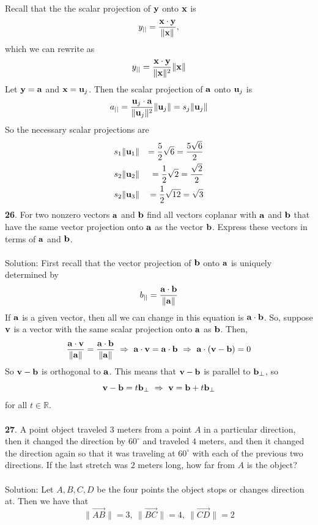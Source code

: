 \documentclass[12pt]{amsbook}
\begin{document}
Recall that the the scalar projection of $\bf y$ onto $\bf x$ is 
$$y_{||}=\frac{{\bf x}\cdot{\bf y}}{\|\bf x\|},$$
which we can rewrite as 
$$y_{||}=\frac{{\bf x}\cdot{\bf y}}{\|{\bf x}\|^2}\|\bf x\|$$
Let ${\bf y}=\bf a$ and ${\bf x}={\bf u}_j$. Then the scalar projection of $\bf a$ onto ${\bf u}_j$ is 
$$a_{||}=\frac{{\bf u}_j\cdot{\bf a}}{\|{\bf u}_j\|^2}\|{\bf u}_j\|=s_j\|{\bf u}_j\|$$
So the necessary scalar projections are
\begin{eqnarray*}
s_1\|{\bf u}_1\|&&=\frac 52 \sqrt{6}= \frac{5\sqrt{6}}{2}\\
s_2\|{\bf u}_2\|&&=\frac 12 \sqrt{2}= \frac{\sqrt{2}}{2}\\
s_2\|{\bf u}_3\|&&=\frac 12 \sqrt{12}=\sqrt{3} \\
\end{eqnarray*}
{\small\bf 26}. For two nonzero vectors ${\bf a}$ and ${\bf b}$
find all vectors coplanar with ${\bf a}$ and ${\bf b}$
that have the same vector projection onto ${\bf a}$ as 
the vector ${\bf b}$. Express these vectors in terms of 
${\bf a}$ and ${\bf b}$.\\
\\
{\sc Solution}:
First recall that the vector projection of $\bf b$ onto $\bf a$ is uniquely determined by 
$$b_{||}=\frac{{\bf a}\cdot{\bf b}}{\|\bf a\|}$$
If $\bf a$ is a given vector, then all we can change in this equation is ${\bf a}\cdot{\bf b}$. So, suppose $\bf v$ is a vector with the same scalar projection onto $\bf a$ as $\bf b$. Then,
$$\frac{{\bf a}\cdot{\bf v}}{\|\bf a\|}=\frac{{\bf a}\cdot{\bf b}}{\|\bf a\|} \ \Rightarrow \ {\bf a}\cdot{\bf v}={\bf a}\cdot{\bf b} \ \Rightarrow \ {\bf a}\cdot({\bf v-b})=0$$
So $\bf v-b$ is orthogonal to $\bf a$. This means that $\bf v-b$ is parallel to ${\bf b}_{\perp}$, so
$${\bf v-b}=t{\bf b}_{\perp} \ \Rightarrow \ {\bf v}={\bf b}+t{\bf b}_{\perp}$$
for all $t \in \mathbb{R}$.
\\
\\
{\small\bf 27}. A point object traveled $3$ meters from a point $A$
in a particular direction, then it changed the direction 
by $60^\circ$ and traveled $4$ meters, and then 
it changed the direction again so that
it was traveling at $60^\circ$ with each of the previous
two directions. If the last stretch was $2$ meters long,
how far from $A$ is the object?\\
\\
{\sc Solution}: Let $A, B, C, D$ be the four points the object stops or changes direction at. Then we have that 
$$\|\overrightarrow{AB}\|=3, \ \|\overrightarrow{BC}\|=4, \ \|\overrightarrow{CD}\|=2$$
\end{document}
